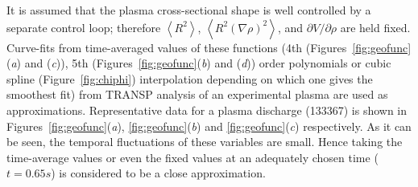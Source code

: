 \documentclass{iopart}
\begin{document}
It is assumed that the plasma cross-sectional shape is well controlled by a
separate control loop; therefore $\left< R^2 \right>$, $\left< R^2
  (\nabla\rho)^2 \right>$, and $\partial V/\partial \rho$ are held fixed.
Curve-fits from time-averaged values of these functions (4th (Figures~\ref{fig:geofunc}(\emph{a}) and (\emph{c})), 5th (Figures~\ref{fig:geofunc}(\emph{b}) and (\emph{d})) order
polynomials or cubic spline (Figure~{\ref{fig:chiphi}}) interpolation depending on which one gives the smoothest fit) from TRANSP analysis of an experimental
plasma are used as approximations.
%
Representative data for a plasma discharge (133367) is shown in
Figures~\ref{fig:geofunc}(\emph{a}), \ref{fig:geofunc}(\emph{b}) and
\ref{fig:geofunc}(\emph{c}) respectively.  As it can be seen, the temporal
fluctuations of these variables are small. Hence taking the time-average values
or even the fixed values at an adequately chosen time ($t = 0.65 s$) is
considered to be a close approximation.
%
\end{document}
